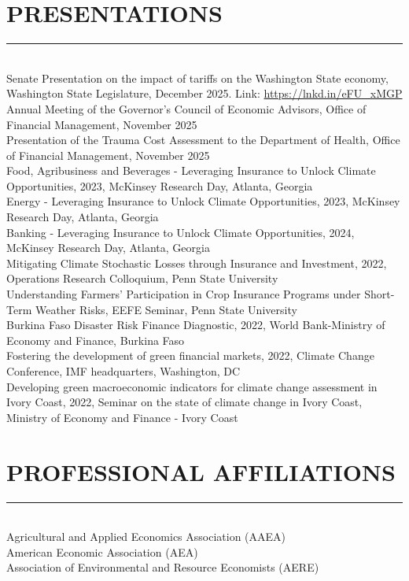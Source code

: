 \documentclass[overlapped]{res}
\begin{document}
\begin{resume}
\section{PRESENTATIONS}
\vspace{-3 mm}
\noindent\rule{\textwidth}{1pt}\\
Senate Presentation on the impact of tariffs on the Washington State economy, Washington State Legislature, December 2025. Link: \url{https://lnkd.in/eFU_xMGP}\\[2mm]
Annual Meeting of the Governor's Council of Economic Advisors, Office of Financial Management, November 2025\\[2mm]
Presentation of the Trauma Cost Assessment to the Department of Health, Office of Financial Management, November 2025\\[3mm]
Food, Agribusiness and Beverages - Leveraging Insurance to Unlock Climate Opportunities, 2023, McKinsey Research Day, Atlanta, Georgia\\[2mm]
Energy - Leveraging Insurance to Unlock Climate Opportunities, 2023, McKinsey Research Day, Atlanta, Georgia\\[2 mm]
Banking - Leveraging Insurance to Unlock Climate Opportunities, 2024, McKinsey Research Day, Atlanta, Georgia\\[2 mm]
Mitigating Climate Stochastic Losses through Insurance and Investment,
2022, Operations Research Colloquium, Penn State University\\[2mm]
Understanding Farmers' Participation in Crop Insurance Programs under Short-Term Weather Risks, EEFE Seminar, Penn State University\\[2 mm]
Burkina Faso Disaster Risk Finance Diagnostic, 2022, World Bank-Ministry of Economy and Finance, Burkina Faso\\[2 mm]
Fostering the development of green financial markets, 2022, Climate Change Conference, IMF headquarters, Washington, DC\\[2 mm]
Developing green macroeconomic indicators for climate change assessment in Ivory Coast, 2022, Seminar on the state of climate change in Ivory Coast, Ministry of Economy and Finance - Ivory Coast
\section{PROFESSIONAL AFFILIATIONS}
\vspace{-3 mm}
\noindent\rule{\textwidth}{1pt}\\
Agricultural and Applied Economics Association (AAEA)\\
American Economic Association (AEA)\\
Association of Environmental and Resource Economists (AERE)

\end{resume}
\end{document}

